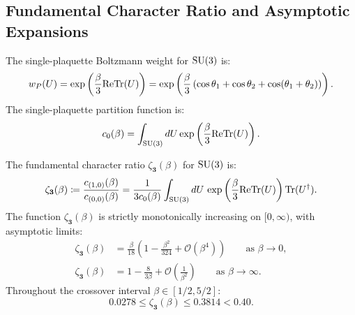 \subsection{Fundamental Character Ratio and Asymptotic Expansions}
\label{subsec:su3_character_ratio_props}

The single-plaquette Boltzmann weight for $\mathrm{SU}(3)$ is:
\begin{equation}
w_P(U) = \exp\left( \frac{\beta}{3} \mathrm{Re} \mathrm{Tr}(U) \right) = \exp\left( \frac{\beta}{3} \left( \cos\theta_1 + \cos\theta_2 + \cos(\theta_1 + \theta_2) \right) \right).
\end{equation}
The single-plaquette partition function is:
\begin{equation}
\label{eq:su3_c0_integral}
c_0(\beta) = \int_{\mathrm{SU}(3)} dU \exp\left( \frac{\beta}{3} \mathrm{Re} \mathrm{Tr}(U) \right).
\end{equation}

\begin{proposition}
\label{prop:su3_character_ratios}
The fundamental character ratio $\zeta_{\mathbf{3}}(\beta)$ for $\mathrm{SU}(3)$ is:
\begin{equation}
\label{eq:zeta_3_def}
\zeta_{\mathbf{3}}(\beta) \coloneqq \frac{c_{(1,0)}(\beta)}{c_{(0,0)}(\beta)} = \frac{1}{3 c_0(\beta)} \int_{\mathrm{SU}(3)} dU \, \exp\left( \frac{\beta}{3} \mathrm{Re} \mathrm{Tr}(U) \right) \mathrm{Tr}(U^\dagger).
\end{equation}
The function $\zeta_{\mathbf{3}}(\beta)$ is strictly monotonically increasing on $[0, \infty)$, with asymptotic limits:
\begin{align}
\zeta_{\mathbf{3}}(\beta) &= \frac{\beta}{18} \left( 1 - \frac{\beta^2}{324} + \mathcal{O}(\beta^4) \right) \qquad \text{as } \beta \to 0, \label{eq:su3_strong_asymptotics} \\
\zeta_{\mathbf{3}}(\beta) &= 1 - \frac{8}{3\beta} + \mathcal{O}\left(\frac{1}{\beta^2}\right) \qquad \text{as } \beta \to \infty. \label{eq:su3_weak_asymptotics}
\end{align}
Throughout the crossover interval $\beta \in [1/2, 5/2]$:
\begin{equation}
\label{eq:su3_crossover_bounds}
0.0278 \le \zeta_{\mathbf{3}}(\beta) \le 0.3814 < 0.40.
\end{equation}
\end{proposition}

